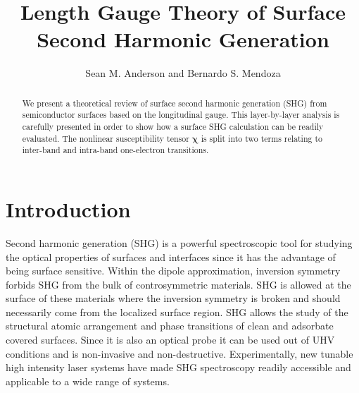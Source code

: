 \documentclass[floatfix,prb,aps,superscriptaddress,11pt,preprint,letterpaper]{revtex4}
\begin{document}
\title{Length Gauge Theory of Surface Second Harmonic Generation}
\author{Sean M. Anderson and Bernardo S. Mendoza}

\begin{abstract}
We present a theoretical review of surface second harmonic generation (SHG) 
from semiconductor surfaces based on the longitudinal gauge. This 
layer-by-layer analysis is carefully presented in order to show how a 
surface SHG calculation can be readily evaluated. The nonlinear susceptibility 
tensor $\boldsymbol{\chi}$ is split into two terms relating to inter-band 
and intra-band one-electron transitions. 


\end{abstract}  

\maketitle
\tableofcontents

\section{Introduction}\label{intro}

Second harmonic generation (SHG) is a powerful spectroscopic tool for 
studying the optical properties of surfaces and interfaces since it has 
the advantage of being surface sensitive. Within the dipole approximation, 
inversion symmetry forbids SHG from the bulk of controsymmetric materials. 
SHG is allowed at the surface of these materials where the inversion symmetry 
is broken and should necessarily come from the localized surface region. 
SHG allows the study of the structural atomic arrangement and phase 
transitions of clean and adsorbate covered surfaces. Since it is also an 
optical probe it can be used out of UHV conditions and is non-invasive 
and non-destructive. Experimentally, new tunable high intensity laser systems 
have made SHG spectroscopy readily accessible and applicable to a wide range 
of systems.\cite{downer_optical_2001,lupke_characterization_1999}
\end{document}
